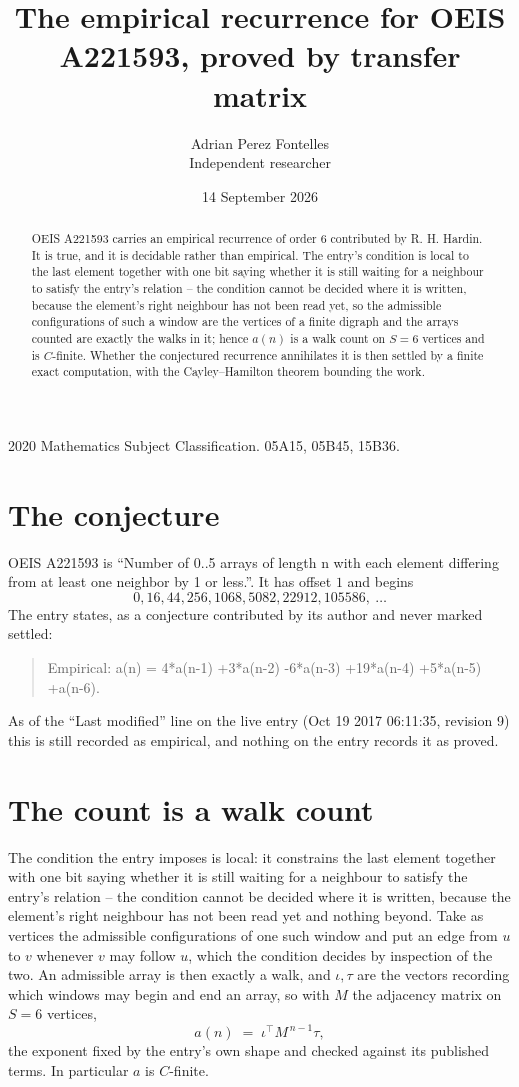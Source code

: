\documentclass[11pt,a4paper]{article}
\title{The empirical recurrence for OEIS A221593, proved by transfer matrix}
\author{Adrian Perez Fontelles\\ \small Independent researcher}
\date{14 September 2026}
\theoremstyle{plain}
\theoremstyle{definition}
\begin{document}
\maketitle

\begin{abstract}
OEIS A221593 carries an empirical recurrence of order $6$ contributed by R. H. Hardin. It is
true, and it is decidable rather than empirical. The entry's condition is local to the last element together with one bit saying whether it is still waiting for a neighbour to satisfy the entry's relation -- the condition cannot be decided where it is written, because the element's right neighbour has not been read yet, so
the admissible configurations of such a window are the vertices of a finite digraph and the
arrays counted are exactly the walks in it; hence $a(n)$ is a walk count on $S=6$ vertices
and is $C$-finite. Whether the conjectured recurrence annihilates it is then settled by a
finite exact computation, with the Cayley--Hamilton theorem bounding the work.
\end{abstract}

\noindent\small 2020 Mathematics Subject Classification. 05A15, 05B45, 15B36.\normalsize

\section{The conjecture}

OEIS A221593 is ``Number of 0..5 arrays of length n with each element differing from at least one neighbor by 1 or less.''. It has offset $1$ and begins
\[
0, 16, 44, 256, 1068, 5082, 22912, 105586,\ \dots
\]
The entry states, as a conjecture contributed by its author and never marked settled:
\begin{quote}
Empirical: a(n) = 4*a(n-1) +3*a(n-2) -6*a(n-3) +19*a(n-4) +5*a(n-5) +a(n-6).
\end{quote}
As of the ``Last modified'' line on the live entry (Oct 19 2017 06:11:35, revision 9) this is still
recorded as empirical, and nothing on the entry records it as proved.

\section{The count is a walk count}

The condition the entry imposes is local: it constrains the last element together with one bit saying whether it is still waiting for a neighbour to satisfy the entry's relation -- the condition cannot be decided where it is written, because the element's right neighbour has not been read yet and nothing beyond. Take as vertices the admissible configurations of one such window and put an edge from $u$ to $v$ whenever $v$ may follow $u$, which the condition decides by inspection of the two.
An admissible array is then exactly a walk, and $\iota,\tau$ are the vectors recording which windows may begin and end an array, so with $M$ the adjacency matrix on $S=6$ vertices,
\[
a(n)\;=\;\iota^{\!\top}M^{\,n-1}\tau ,
\]
the exponent fixed by the entry's own shape and checked against its published terms. In
particular $a$ is $C$-finite.
\end{document}
